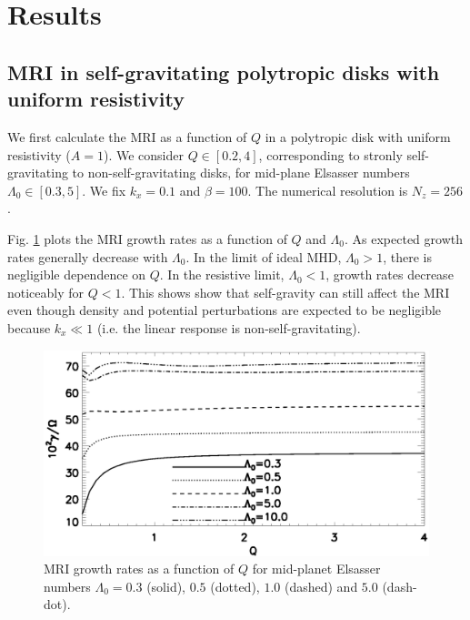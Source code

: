 \section{Results}

\subsection{MRI in self-gravitating polytropic disks with uniform
  resistivity}  
We first calculate the MRI as a function of $Q$ in a polytropic disk
with uniform resistivity ($A=1$). We consider $Q\in[0.2,4]$,
corresponding to stronly self-gravitating to non-self-gravitating
disks, for mid-plane Elsasser numbers $\Lambda_0\in[0.3,5]$. 
We fix $k_x=0.1$ and $\beta=100$. The numerical resolution is
$N_z=256$. 

Fig. \ref{compare_growth_poly_uniresis} plots the MRI growth rates as
a function of $Q$ and $\Lambda_0$. As expected growth rates generally
decrease with $\Lambda_0$. In the limit of ideal MHD, $\Lambda_0>1$,
there is negligible dependence on $Q$. In the resistive limit,
$\Lambda_0<1$, growth rates decrease noticeably for $Q<1$. This shows
show that self-gravity can still affect the MRI even  
though density and potential perturbations are expected to be
negligible because $k_x\ll1$ (i.e. the linear response is
non-self-gravitating).    
 
\begin{figure}
  \includegraphics[width=\linewidth]{figures/compare_growth_poly_uniresis}
  \caption{MRI growth rates as a function of $Q$ for mid-planet
    Elsasser numbers $\Lambda_0=0.3$ (solid), $0.5$ (dotted), $1.0$
    (dashed) and $5.0$ (dash-dot).  
    \label{compare_growth_poly_uniresis}}
\end{figure}


